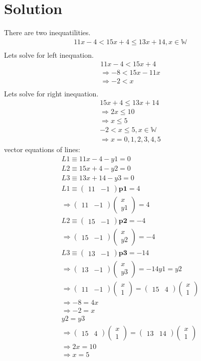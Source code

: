 \documentclass[12pt,two column]{article}
\newcommand{\myvec}[1]{\ensuremath{\begin{pmatrix}#1\end{pmatrix}}}
\let\vec\mathbf
\begin{document}
 \section*{Solution}
There are two inequatilities.\\
\begin{align*}
 11x-4 < 15x+4\le13x+14,  x\in \mathbb{W}\\
\end{align*}
Lets solve for left inequation.
\begin{align*}
 11x-4<15x+4\\
 \Rightarrow -8<15x-11x\\
 \Rightarrow-2<x\\
\end{align*}
 Lets solve for right inequation.\\
\begin{align*}
  15x+4\le13x+14\\
\Rightarrow 2x\le10\\
\Rightarrow x\le5\\
 -2 < x\le5,
x\in \mathbb{W}\\
\Rightarrow x=0,1,2,3,4,5 
\end{align*}
vector equations of lines:
\begin{align*}

 L1 \equiv 11x-4-y1=0\\
L2 \equiv 15x+4-y2=0\\
L3 \equiv 13x+14-y3=0\\

L1 \equiv \myvec{11 & -1} \vec{p1}=4\\
\Rightarrow \myvec{11 & -1} \myvec{x \\ y1}=4\\
L2 \equiv \myvec{15 & -1} \vec{p2}=-4\\
\Rightarrow \myvec{15 & -1} \myvec{x \\ y2}=-4\\
L3 \equiv \myvec{13 & -1} \vec{p3}=-14\\
\Rightarrow \myvec{13 & -1} \myvec{x \\ y3}=-14 

y1=y2\\
\Rightarrow \myvec{11 & -1}\myvec{x\\1}=\myvec{15 & 4} \myvec{x \\ 1}\\
\Rightarrow -8=4x\\
\Rightarrow -2=x\\
y2=y3\\
\Rightarrow \myvec{15 & 4}\myvec{x\\1}=\myvec{13 & 14} \myvec{x \\ 1}\\
\Rightarrow 2x=10\\
\Rightarrow x=5\\
\end{align*}
\end{document}
